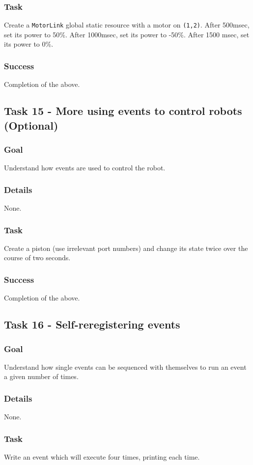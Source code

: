 \documentclass[a4paper]{article}
\begin{document}
\subsubsection{Task} Create a \lstinline{MotorLink} global static resource with a motor on \lstinline{(1,2)}. After 500msec, set its power to 50\%. After 1000msec, set its power to -50\%. After 1500 msec, set its power to 0\%. 
\subsubsection{Success} Completion of the above.

\subsection{Task 15 - More using events to control robots (Optional)}
\subsubsection{Goal} Understand how events are used to control the robot.
\subsubsection{Details} None.
\subsubsection{Task} Create a piston (use irrelevant port numbers) and change its state twice over the course of two seconds.
\subsubsection{Success} Completion of the above.

\subsection{Task 16 - Self-reregistering events}
\subsubsection{Goal} Understand how single events can be sequenced with themselves to run an event a given number of times.
\subsubsection{Details} None.
\subsubsection{Task} Write an event which will execute four times, printing each time.
\end{document}
